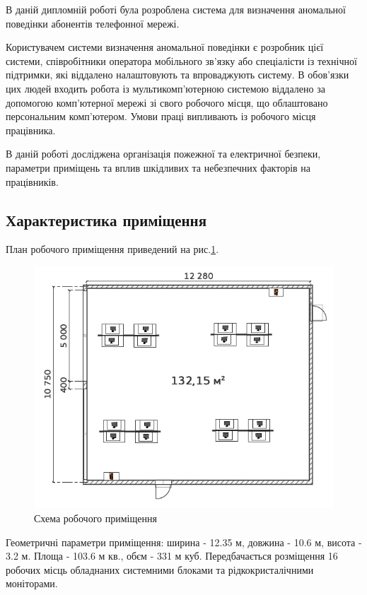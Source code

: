\newpage
{}
    В даній дипломній роботі була розроблена система для визначення аномальної поведінки абонентів телефонної мережі.

    Користувачем системи визначення аномальної поведінки є розробник цієї системи, співробітники оператора мобільного зв'язку або спеціалісти із технічної підтримки, які віддалено налаштовують та впроваджують систему. В обов'язки цих людей входить робота із мультикомп'ютерною системою віддалено за допомогою комп'ютерної мережі зі свого робочого місця, що облаштовано персональним комп'ютером. Умови праці випливають із робочого місця працівника.

    В даній роботі досліджена організація пожежної та електричної безпеки, параметри приміщень та вплив шкідливих та небезпечних факторів на працівників.
    
\subsection{Характеристика приміщення}
\TBD
    План робочого приміщення приведений на рис.\ref{fig:lab-plan}.
    \begin{figure}[h!]
            \begin{center}
                \includegraphics[scale=0.7]{labour/lab-plan}
            \end{center}
            \caption{Схема робочого приміщення}
            \label{fig:lab-plan}
    \end{figure}

    Геометричні параметри приміщення: ширина - 12.35 м, довжина - 10.6 м, висота - 3.2 м. Площа - 103.6 м кв., обєм - 331 м куб.
    Передбачається розміщення 16 робочих місць обладнаних системними блоками та рідкокристалічними моніторами.

